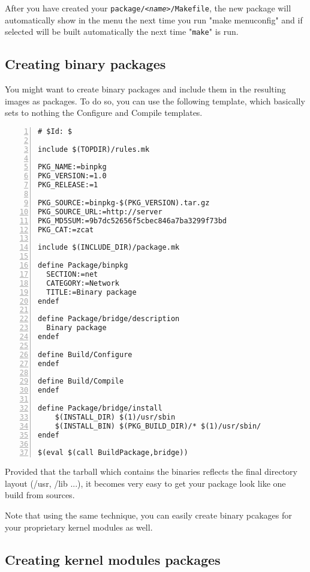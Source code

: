 After you have created your \texttt{package/\textit{<name>}/Makefile}, the new package
will automatically show in the menu the next time you run "make menuconfig" and if selected
will be built automatically the next time "\texttt{make}" is run.

\subsection{Creating binary packages}

You might want to create binary packages and include them in the resulting images as packages.
To do so, you can use the following template, which basically sets to nothing the Configure and
Compile templates.

\begin{Verbatim}[frame=single,numbers=left]
# $Id: $

include $(TOPDIR)/rules.mk

PKG_NAME:=binpkg
PKG_VERSION:=1.0
PKG_RELEASE:=1

PKG_SOURCE:=binpkg-$(PKG_VERSION).tar.gz
PKG_SOURCE_URL:=http://server
PKG_MD5SUM:=9b7dc52656f5cbec846a7ba3299f73bd
PKG_CAT:=zcat

include $(INCLUDE_DIR)/package.mk

define Package/binpkg
  SECTION:=net
  CATEGORY:=Network
  TITLE:=Binary package
endef

define Package/bridge/description
  Binary package
endef

define Build/Configure
endef

define Build/Compile
endef

define Package/bridge/install
    $(INSTALL_DIR) $(1)/usr/sbin
    $(INSTALL_BIN) $(PKG_BUILD_DIR)/* $(1)/usr/sbin/
endef

$(eval $(call BuildPackage,bridge))
\end{Verbatim}

Provided that the tarball which contains the binaries reflects the final
directory layout (/usr, /lib ...), it becomes very easy to get your package
look like one build from sources.

Note that using the same technique, you can easily create binary pcakages
for your proprietary kernel modules as well.

\subsection{Creating kernel modules packages}

